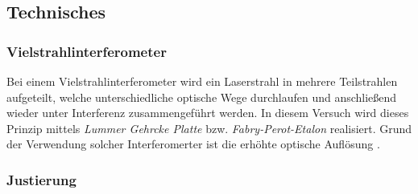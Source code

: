 \documentclass[../main.tex]{subfiles}
\begin{document}
    \subsection{Technisches}
        \subsubsection*{Vielstrahlinterferometer}
            Bei einem Vielstrahlinterferometer wird ein Laserstrahl in mehrere Teilstrahlen aufgeteilt, welche unterschiedliche optische Wege durchlaufen und anschließend wieder unter Interferenz zusammengeführt werden. In diesem Versuch wird dieses Prinzip mittels \emph{Lummer Gehrcke Platte} bzw. \emph{Fabry-Perot-Etalon} realisiert. Grund der Verwendung solcher Interferomerter ist die erhöhte optische Auflösung \cite[p.703f]{skript}.

        \subsubsection*{Justierung}
\end{document}
